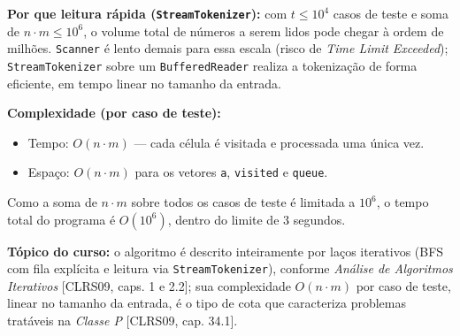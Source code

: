 \textbf{Por que leitura rápida (\texttt{StreamTokenizer}):} com
$t \leq 10^4$ casos de teste e soma de $n \cdot m \leq 10^6$, o volume total
de números a serem lidos pode chegar à ordem de milhões. \texttt{Scanner} é
lento demais para essa escala (risco de \emph{Time Limit Exceeded});
\texttt{StreamTokenizer} sobre um \texttt{BufferedReader} realiza a
tokenização de forma eficiente, em tempo linear no tamanho da entrada.

\textbf{Complexidade (por caso de teste):}
\begin{itemize}
    \item Tempo: $O(n \cdot m)$ --- cada célula é visitada e processada uma
    única vez.
    \item Espaço: $O(n \cdot m)$ para os vetores \texttt{a},
    \texttt{visited} e \texttt{queue}.
\end{itemize}

Como a soma de $n \cdot m$ sobre todos os casos de teste é limitada a
$10^6$, o tempo total do programa é $O(10^6)$, dentro do limite de 3
segundos.

\textbf{Tópico do curso:} o algoritmo é descrito inteiramente por laços
iterativos (BFS com fila explícita e leitura via \texttt{StreamTokenizer}),
conforme \emph{Análise de Algoritmos Iterativos} [CLRS09, caps. 1 e 2.2]; sua
complexidade $O(n \cdot m)$ por caso de teste, linear no tamanho da entrada,
é o tipo de cota que caracteriza problemas tratáveis na \emph{Classe P}
[CLRS09, cap. 34.1].
